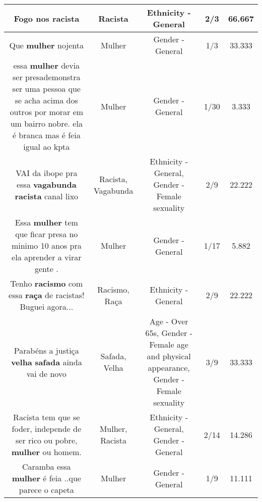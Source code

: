 \documentclass[11pt]{article}
\newlength\mylength
\begin{document}
\begin{center}
\begin{longtable}{|C{.65\mylength}|C{.30\mylength}|C{.12\mylength}|C{.12\mylength}|C{.12\mylength}|}
  \small Fogo nos racista\normalsize   & Racista & Ethnicity - General & 2/3 & 66.667 \\  \hline
  \small Que \textbf{mulher} nojenta\normalsize   & Mulher & Gender - General & 1/3 & 33.333 \\  \hline
  \small essa \textbf{mulher} devia ser presademonstra ser uma pessoa que se acha acima dos outros por morar em um bairro nobre. ela é branca mas é feia igual ao kpta\normalsize   & Mulher & Gender - General & 1/30 & 3.333 \\  \hline
  \small VAI da ibope pra essa \textbf{vagabunda} \textbf{racista} canal lixo\normalsize   & Racista, Vagabunda & Ethnicity - General, Gender - Female sexuality & 2/9 & 22.222 \\  \hline
  \small Essa \textbf{mulher} tem que ficar presa no minimo 10 anos pra ela aprender  a virar gente .\normalsize   & Mulher & Gender - General & 1/17 & 5.882 \\  \hline
  \small Tenho \textbf{racismo} com essa \textbf{raça} de racistas! Buguei agora...\normalsize   & Racismo, Raça & Ethnicity - General & 2/9 & 22.222 \\  \hline
  \small Parabéns a justiça \textbf{v\textbf{elha}} \textbf{safada} ainda vai de novo\normalsize   & Safada, Velha & Age - Over 65s, Gender - Female age and physical appearance, Gender - Female sexuality & 3/9 & 33.333 \\  \hline
  \small Racista tem que se foder, independe de  ser rico ou pobre, \textbf{mulher} ou homem.\normalsize   & Mulher, Racista & Ethnicity - General, Gender - General & 2/14 & 14.286 \\  \hline
  \small Caramba essa \textbf{mulher} é feia ..que parece o capeta\normalsize   & Mulher & Gender - General & 1/9 & 11.111 \\  \hline

\end{longtable}
\end{center}
\end{document}
